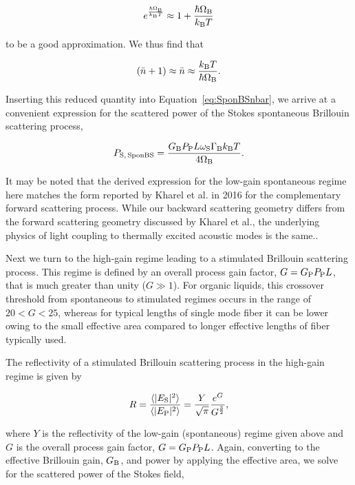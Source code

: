 \begin{equation}
e^{\frac{\hbar\Omega_{\rm B}}{k_{\rm B}T}} \approx 1 + \frac{\hbar\Omega_{\rm B}}{k_{\rm B}T}
\end{equation}

to be a good approximation. We thus find that

\begin{equation}
(\bar{n} + 1) \approx \bar{n} \approx \frac{k_{\rm B}T}{\hbar\Omega_{\rm B}}.
\end{equation}

Inserting this reduced quantity into Equation~\ref{eq:SponBSnbar}, we arrive at a convenient expression for the scattered power of the Stokes spontaneous Brillouin scattering process,

\begin{equation}
  P_{\rm S,\,SponBS} = \frac{G_{\rm B}P_{\rm P}L\omega_{\rm S}\Gamma_{\rm B}k_{\rm B}T}{4\Omega_{\rm B}}.
  \label{eq:sponBSscatteredPower}
\end{equation}

It may be noted that the derived expression for the low-gain spontaneous regime here matches the form reported by Kharel et al. in 2016 \cite{kharel2016noise} for the complementary forward scattering process. While our backward scattering geometry differs from the forward scattering geometry discussed by Kharel et al., the underlying physics of light coupling to thermally excited acoustic modes is the same..

Next we turn to the high-gain regime leading to a stimulated Brillouin scattering process. This regime is defined by an overall process gain factor, \(G = G_{\rm P}P_{\rm P}L\), that is much greater than unity (\(G \gg 1\)). For organic liquids, this crossover threshold from spontaneous to stimulated regimes occurs in the range of \(20 < G < 25\), \cite{boyd1990noise} whereas for typical lengths of single mode fiber it can be lower \cite{ippen1972stimulated} owing to the small effective area compared to longer effective lengths of fiber typically used.

The reflectivity of a stimulated Brillouin scattering process in the high-gain regime is given by \cite{boyd1990noise}

\begin{equation}
  R = \frac{\langle|E_{\rm S}|^{2}\rangle}{\langle|E_{\rm P}|^{2}\rangle} = \frac{Y}{\sqrt{\pi}}\frac{e^{G}}{G^{\frac{3}{2}}},
\end{equation}

where \(Y\) is the reflectivity of the low-gain (spontaneous) regime given above and \(G\) is the overall process gain factor, \(G = G_{\rm P}P_{\rm P}L\). Again, converting to the effective Brillouin gain, \(G_{\rm B}\), and power by applying the effective area, we solve for the scattered power of the Stokes field,

